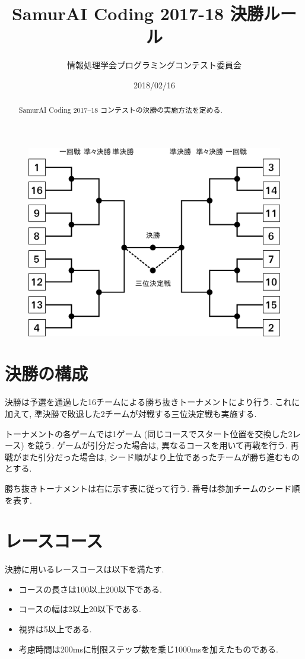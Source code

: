 \documentclass[11pt]{jarticle}
\title{SamurAI Coding 2017-18 決勝ルール}
\author{情報処理学会プログラミングコンテスト委員会}
\date{2018/02/16}
\begin{document}
\maketitle

\begin{abstract}
  SamurAI Coding 2017--18 コンテストの決勝の実施方法を定める.
\end{abstract}

\begin{figure}
  \begin{flushright}
  \vspace{-2cm}
  \includegraphics[width=0.5\columnwidth, natwidth=4.88in, natheight=3.6467in]{tournament-table-jp.png}
  \vspace{-1.5cm}
  \end{flushright}
\end{figure}

\section{決勝の構成}

決勝は予選を通過した16チームによる勝ち抜きトーナメントにより行う.
これに加えて, 準決勝で敗退した2チームが対戦する三位決定戦も実施する.

トーナメントの各ゲームでは1ゲーム (同じコースでスタート位置を交換した2レース) を競う.
ゲームが引分だった場合は, 異なるコースを用いて再戦を行う.
再戦がまた引分だった場合は, シード順がより上位であったチームが勝ち進むものとする.

勝ち抜きトーナメントは右に示す表に従って行う.
番号は参加チームのシード順を表す.

\section{レースコース}
決勝に用いるレースコースは以下を満たす.
\begin{itemize}
\item コースの長さは100以上200以下である.
\item コースの幅は2以上20以下である.
\item 視界は5以上である.
\item 考慮時間は200msに制限ステップ数を乗じ1000msを加えたものである.
\end{itemize}
\end{document}
